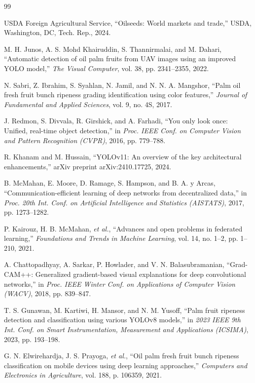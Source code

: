 \documentclass[9pt,twocolumn]{extarticle}
\begin{document}
\begin{thebibliography}{99}

 USDA Foreign Agricultural Service, ``Oilseeds: World markets and trade,'' USDA, Washington, DC, Tech. Rep., 2024.

 M. H. Junos, A. S. Mohd Khairuddin, S. Thannirmalai, and M. Dahari, ``Automatic detection of oil palm fruits from UAV images using an improved YOLO model,'' \emph{The Visual Computer}, vol. 38, pp. 2341--2355, 2022.

 N. Sabri, Z. Ibrahim, S. Syahlan, N. Jamil, and N. N. A. Mangshor, ``Palm oil fresh fruit bunch ripeness grading identification using color features,'' \emph{Journal of Fundamental and Applied Sciences}, vol. 9, no. 4S, 2017.

 J. Redmon, S. Divvala, R. Girshick, and A. Farhadi, ``You only look once: Unified, real-time object detection,'' in \emph{Proc. IEEE Conf. on Computer Vision and Pattern Recognition (CVPR)}, 2016, pp. 779--788.

 R. Khanam and M. Hussain, ``YOLOv11: An overview of the key architectural enhancements,'' arXiv preprint arXiv:2410.17725, 2024.

 B. McMahan, E. Moore, D. Ramage, S. Hampson, and B. A. y Arcas, ``Communication-efficient learning of deep networks from decentralized data,'' in \emph{Proc. 20th Int. Conf. on Artificial Intelligence and Statistics (AISTATS)}, 2017, pp. 1273--1282.

 P. Kairouz, H. B. McMahan, \emph{et al.}, ``Advances and open problems in federated learning,'' \emph{Foundations and Trends in Machine Learning}, vol. 14, no. 1--2, pp. 1--210, 2021.

 A. Chattopadhyay, A. Sarkar, P. Howlader, and V. N. Balasubramanian, ``Grad-CAM++: Generalized gradient-based visual explanations for deep convolutional networks,'' in \emph{Proc. IEEE Winter Conf. on Applications of Computer Vision (WACV)}, 2018, pp. 839--847.

 T. S. Gunawan, M. Kartiwi, H. Mansor, and N. M. Yusoff, ``Palm fruit ripeness detection and classification using various YOLOv8 models,'' in \emph{2023 IEEE 9th Int. Conf. on Smart Instrumentation, Measurement and Applications (ICSIMA)}, 2023, pp. 193--198.

 G. N. Elwirehardja, J. S. Prayoga, \emph{et al.}, ``Oil palm fresh fruit bunch ripeness classification on mobile devices using deep learning approaches,'' \emph{Computers and Electronics in Agriculture}, vol. 188, p. 106359, 2021.


\end{thebibliography}
\end{document}
